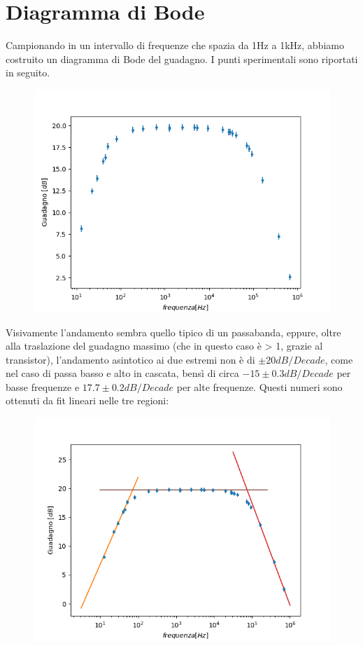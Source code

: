 \documentclass[10pt,a4paper]{article}
\begin{document}
\section{Diagramma di Bode}
 Campionando in un intervallo di frequenze che spazia da 1\si{\hertz} a 1\si{\kilo\hertz}, abbiamo costruito un diagramma di Bode del guadagno. I punti sperimentali sono riportati in seguito.
 \begin{figure}[h]
 	\centering
 	\includegraphics[scale=0.5]{dataBodeplot.png}
	
	
\end{figure}
Visivamente l'andamento sembra quello tipico di un passabanda, eppure, oltre alla traslazione del guadagno massimo (che in questo caso è > 1, grazie al transistor), l'andamento asintotico ai due estremi non è di $\pm 20 dB/Decade$, come nel caso di passa basso e alto in cascata, bensì di circa $-15 \pm0.3dB/Decade $ per basse frequenze e $ 17.7\pm0.2 dB/Decade$ per alte frequenze.
Questi numeri sono ottenuti da fit lineari nelle tre regioni:
\begin{figure}[h]
	\centering
	\includegraphics[scale=0.5]{fit.png}
\end{figure}
\end{document}
